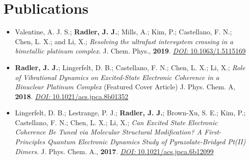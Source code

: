 \documentclass[letterpaper]{deedy-resume} %
\begin{document}
\begin{minipage}[t]{0.65\textwidth}
\section{Publications}
\begin{itemize}
\item Valentine, A. J. S.; \textbf{Radler, J. J.}; Mills, A.; Kim, P.; Castellano, F. N.; Chen, L. X.; and Li, X.;	\textit{Resolving the ultrafast intersystem crossing in a bimetallic platinum complex}. J. Chem. Phys., \textbf{2019}. \href{https://doi.org/10.1063/1.5115169}{\textit{DOI: }10.1063/1.5115169}

\item \textbf{Radler, J. J.}; Lingerfelt, D. B.; Castellano, F. N.; Chen, L. X.; Li, X.;	\textit{Role of Vibrational Dynamics on Excited-State Electronic Coherence in a Binuclear Platinum Complex} (Featured Cover Article) J. Phys. Chem. A, \textbf{2018}. \href{https://pubs.acs.org/doi/10.1021/acs.jpca.8b01352}{\textit{DOI:} 10.1021/acs.jpca.8b01352}

\item Lingerfelt, D. B.; Lestrange, P. J.; \textbf{Radler, J. J.}; Brown-Xu, S. E.; Kim, P.; Castellano, F. N.; Chen, L. X.; Li, X.;	\textit{Can Excited State Electronic Coherence Be Tuned via Molecular Structural Modification? A First-Principles Quantum Electronic Dynamics Study of Pyrazolate-Bridged Pt(II) Dimers}.
J. Phys. Chem. A., \textbf{2017}. \href{https://pubs.acs.org/doi/10.1021/acs.jpca.6b12099}{\textit{DOI:} 10.1021/acs.jpca.6b12099}
\end{itemize}


\end{minipage} %


\newpage %



\end{document}
